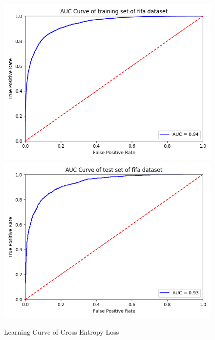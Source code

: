 \documentclass{article}
\begin{document}
\begin{figure}[h]
  \centering
  \includegraphics[scale=0.3]{fifa_auc_train.png}
  \includegraphics[scale=0.3]{fifa_auc_test.png}
  \caption{Learning Curve of Cross Entropy Loss}
\end{figure}
\end{document}
